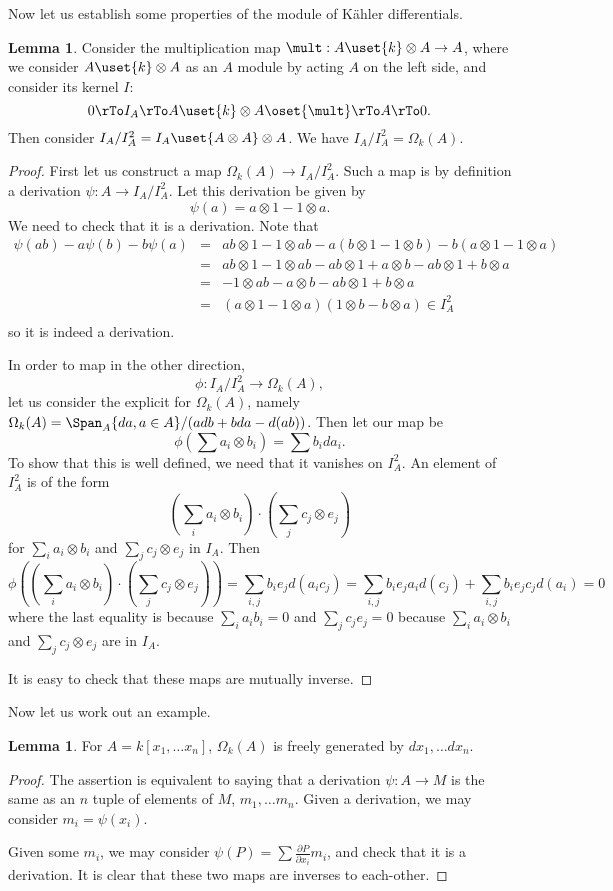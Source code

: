 \documentclass[12 pt]{article}
\theoremstyle{definition}
\newtheorem{lemma}[thm]{Lemma}
\renewcommand{\(}{\left(}
\renewcommand{\)}{\right)}
\begin{document}
Now let us establish some properties of the module of K\"{a}hler differentials.
\begin{lemma}
Consider the multiplication map $\mult:A \uset{k}\otimes A \to A$, where we consider $A \uset{k}\otimes A$ as an $A$ module by acting $A$ on the left side, and consider its kernel $I$:
\[0 \rTo I_A \rTo A \uset{k}\otimes A \oset{\mult}\rTo A \rTo 0.\]
Then consider $I_A/I_A^2=I_A \uset{A \otimes A}\otimes A$. We have $I_A/I_A^2=\Omega_k(A)$.
\end{lemma}
\begin{proof} First let us construct a map $\Omega_k(A) \to I_A/I_A^2$. Such a map is by definition a derivation $\psi:A \to I_A/I_A^2$. Let this derivation be given by
\[\psi(a) = a \otimes 1-1 \otimes a.\]
We need to check that it is a derivation. Note that
\begin{eqnarray*}
\psi(ab)-a\psi(b)-b\psi(a) & = & ab \otimes 1-1 \otimes ab-a(b \otimes 1-1 \otimes b)-b(a \otimes 1-1 \otimes a)\\
& = & ab \otimes 1-1 \otimes ab-ab \otimes 1+a \otimes b -ab \otimes 1+b \otimes a\\
& = &-1 \otimes ab-a \otimes b -ab \otimes 1+b \otimes a\\
& = & (a \otimes 1-1 \otimes a)(1 \otimes b-b \otimes a) \in I_A^2\\
\end{eqnarray*}
so it is indeed a derivation.

In order to map in the other direction,
\[\phi:I_A/I_A^2 \to \Omega_k(A),\]
let us consider the explicit for $\Omega_k(A)$, namely $\Omega_k(A)=\Span_A\{da,a \in A\}/(adb+bda-d(ab))$.
Then let our map be
\[\phi(\sum a_i \otimes b_i)=\sum b_ida_i.\]
To show that this is well defined, we need that it vanishes on $I_A^2$. An element of $I_A^2$ is of the form
\[\(\sum_ia_i \otimes b_i\) \cdot \(\sum_jc_j \otimes e_j\)\]
for $\sum_ia_i \otimes b_i$ and $\sum_jc_j \otimes e_j$ in $I_A$. Then
\[\phi\(\(\sum_ia_i \otimes b_i\) \cdot \(\sum_jc_j \otimes e_j\)\)=\sum_{i,j} b_ie_jd(a_ic_j)=\sum_{i,j} b_ie_ja_id(c_j)+\sum_{i,j} b_ie_jc_jd(a_i)=0\]
where the last equality is because $\sum_ia_ib_i=0$ and $\sum_jc_je_j=0$ because $\sum_ia_i \otimes b_i$ and $\sum_jc_j \otimes e_j$ are in $I_A$.

It is easy to check that these maps are mutually inverse.
\end{proof}

Now let us work out an example.
\begin{lemma} For $A=k[x_1, \ldots x_n]$, $\Omega_k(A)$ is freely generated by $dx_1, \ldots dx_n$.
\end{lemma}
\begin{proof} The assertion is equivalent to saying that a derivation $\psi:A \to M$ is the same as an $n$ tuple of elements of $M$, $m_1, \ldots m_n$. Given a derivation, we may consider $m_i=\psi(x_i)$.

Given some $m_i$, we may consider $\psi(P)=\sum \frac{\partial P}{\partial x_i} m_i$, and check that it is a derivation. It is clear that these two maps are inverses to each-other.
\end{proof}
\end{document}
